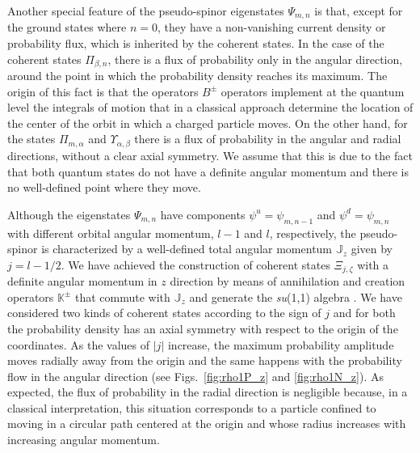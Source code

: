 \documentclass[aps,showpacs,showkeys]{revtex4}
\begin{document}
Another special feature of the pseudo-spinor eigenstates $\Psi_{m,n}$ is that, except for the ground states where $n=0$, they have a non-vanishing current density or probability flux, which is inherited by the coherent states. In the case of the coherent states $\Pi_{\beta,n}$, there is a flux of probability only in the angular direction, around the point in which the probability density reaches its maximum. The origin of this fact is that the operators $B^{\pm}$ operators implement at the quantum level the integrals of motion that in a classical approach determine the location of the center of the orbit in which a charged particle moves. On the other hand, for the states $\Pi_{m,\alpha}$ and $\Upsilon_{\alpha,\beta}$ there is a flux of probability in the angular and radial directions, without a clear axial symmetry. We assume that this is due to the fact that both quantum states do not have a definite angular momentum and there is no well-defined point where they move.


Although the eigenstates $\Psi_{m,n}$ have components $\psi^u=\psi_{m,n-1}$ and $\psi^d=\psi_{m,n}$ with different orbital angular momentum, $l-1$ and $l$, respectively, the pseudo-spinor is characterized by a well-defined total angular momentum $\mathbb{J}_{z}$ given by $j=l-1/2$. We have achieved the construction of coherent states $\Xi_{j,\zeta}$ with a definite angular momentum in $z$ direction by means of annihilation and creation operators $\mathbb{K}^\pm$ that commute with 
$\mathbb{J}_{z}$ and generate the {\it su}(1,1) algebra \cite{f04,ng03,dhm12,dm13}. We have considered two kinds of coherent states according to the sign of $j$ and for both the probability density has an axial symmetry with respect to the origin of the coordinates. As the values of $\vert j\vert$ increase, the maximum probability amplitude moves radially away from the origin and the same happens with the probability flow in the angular direction (see Figs.~\ref{fig:rho1P_z} and \ref{fig:rho1N_z}). As expected, the flux of probability in the radial direction is negligible because, in a classical interpretation, this situation corresponds to a particle confined to moving in a circular path centered at the origin and whose radius increases with increasing angular momentum.
\end{document}

